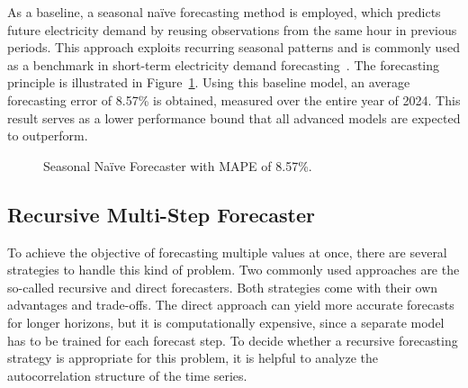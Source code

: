 As a baseline, a seasonal na\"{i}ve forecasting method is employed, which predicts future electricity demand by reusing observations from the same hour in previous periods. This approach exploits recurring seasonal patterns and is commonly used as a benchmark in short-term electricity demand forecasting~\cite{beck_2025_naive}. The forecasting principle is illustrated in Figure~\ref{fig:baseline}. Using this baseline model, an average forecasting error of 8.57\% is obtained, measured over the entire year of 2024. This result serves as a lower performance bound that all advanced models are expected to outperform.
\begin{figure}[ht]
    \centering
    
    \caption{Seasonal Na\"{i}ve Forecaster with \acs{MAPE} of 8.57\%.}
    \label{fig:baseline}
\end{figure}

\subsection{Recursive Multi-Step Forecaster}
\label{subsec:forecaster} 
To achieve the objective of forecasting multiple values at once, there are several strategies to handle this kind of problem. Two commonly used approaches are the so-called recursive and direct forecasters. Both strategies come with their own advantages and trade-offs. The direct approach can yield more accurate forecasts for longer horizons, but it is computationally expensive, since a separate model has to be trained for each forecast step. To decide whether a recursive forecasting strategy is appropriate for this problem, it is helpful to analyze the autocorrelation structure of the time series.

